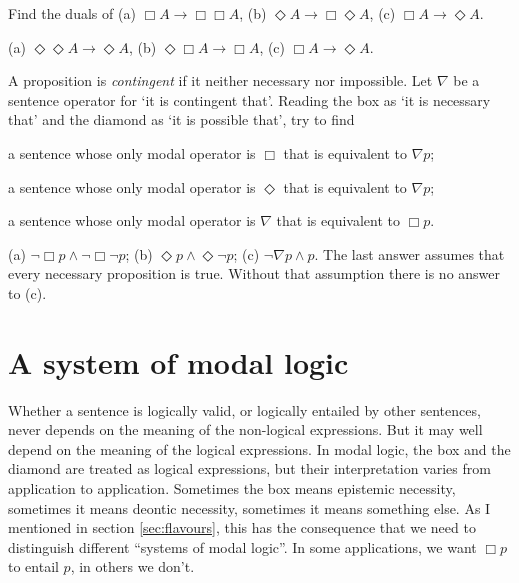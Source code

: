 
\begin{exercise}
 Find the duals of (a) $\Box A \to \Box\Box A$, (b) $\Diamond A \to \Box\Diamond A$, (c) $\Box A \to \Diamond A$.
\end{exercise}
\begin{solution}
  (a) $\Diamond\Diamond A \to \Diamond A$, (b) $\Diamond\Box A \to \Box A$, (c)
  $\Box A \to \Diamond A$.
\end{solution}

\begin{exercise}
  A proposition is \emph{contingent} if it neither necessary nor impossible. Let
  $\nabla$ be a sentence operator for `it is contingent that'. Reading the box as `it is necessary that' and the diamond as `it is possible that', try to find
  \begin{exlist}
    \item a sentence whose only modal operator is $\Box$ that is equivalent to
    $\nabla p$;
    \item a sentence whose only modal operator is $\Diamond$ that is equivalent to
    $\nabla p$;
    \item a sentence whose only modal operator is $\nabla$ that is equivalent to $\Box p$.
  \end{exlist}
\end{exercise}
\begin{solution}
  (a) $\neg \Box p \land \neg\Box\neg p$; (b)
  $\Diamond p \land \Diamond \neg p$; (c) $\neg\nabla p \land p$. The last
  answer assumes that every necessary proposition is true. Without that
  assumption there is no answer to (c). %
\end{solution}

\section{A system of modal logic}%
\label{sec:systems}

Whether a sentence is logically valid, or logically entailed by other sentences,
never depends on the meaning of the non-logical expressions. But it may well
depend on the meaning of the logical expressions. In modal logic, the box and
the diamond are treated as logical expressions, but their interpretation varies
from application to application. Sometimes the box means epistemic necessity,
sometimes it means deontic necessity, sometimes it means something else. As I
mentioned in section \ref{sec:flavours}, this has the consequence that we need
to distinguish different ``systems of modal logic''. In some applications, we
want $\Box p$ to entail $p$, in others we don't.

